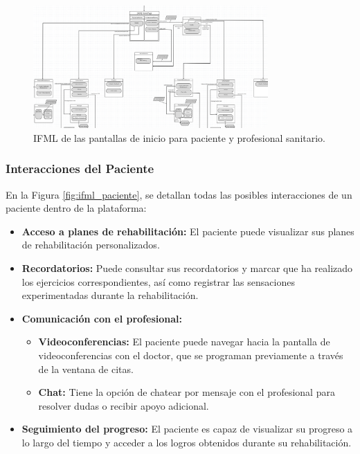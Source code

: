 \documentclass{article}
\begin{document}
\begin{figure}[H]
	\centering
	\includegraphics[width=0.8\textwidth]{images/ifml_home.png}
	\caption{IFML de las pantallas de inicio para paciente y profesional sanitario.}
	\label{fig:ifml_home}
\end{figure}

\subsubsection{Interacciones del Paciente}

En la Figura \ref{fig:ifml_paciente}, se detallan todas las posibles interacciones de un paciente dentro de la plataforma:

\begin{itemize}
	\item \textbf{Acceso a planes de rehabilitación:} El paciente puede visualizar sus planes de rehabilitación personalizados.
	\item \textbf{Recordatorios:} Puede consultar sus recordatorios y marcar que ha realizado los ejercicios correspondientes, así como registrar las sensaciones experimentadas durante la rehabilitación.
	\item \textbf{Comunicación con el profesional:} 
	\begin{itemize}
		\item \textbf{Videoconferencias:} El paciente puede navegar hacia la pantalla de videoconferencias con el doctor, que se programan previamente a través de la ventana de citas.
		\item \textbf{Chat:} Tiene la opción de chatear por mensaje con el profesional para resolver dudas o recibir apoyo adicional.
	\end{itemize}
	\item \textbf{Seguimiento del progreso:} El paciente es capaz de visualizar su progreso a lo largo del tiempo y acceder a los logros obtenidos durante su rehabilitación.
\end{itemize}
\end{document}
